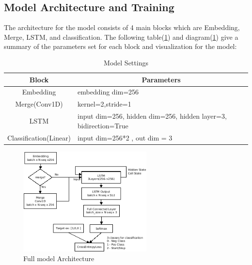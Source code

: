 \documentclass[12pt]{article}
\begin{document}
\subsection{Model Architecture and Training}\label{modelarch}
The architecture for the model consists of 4 main blocks which are Embedding, Merge, LSTM, and classification. The following table(\ref{tab:modelsettings}) and diagram(\ref{fig:modelArch}) give a summary of the parameters set for each block and visualization for the model:
\begin{table}[!h]
\begin{tabular}{|c|l|}
\hline
Block                   & \multicolumn{1}{c|}{Parameters}                                 \\ \hline
Embedding               & embedding dim=256                                               \\ \hline
Merge(Conv1D)          & kernel=2,stride=1                                               \\ \hline
LSTM                    & input dim=256, hidden dim=256, hidden layer=3, bidirection=True \\ \hline
Classification(Linear) & input dim=256*2 , out dim = 3                                   \\ \hline
\end{tabular}
\caption{Model Settings}
\label{tab:modelsettings}
\end{table}
\newpage
\begin{figure} [!h]
\begin{center}
\includegraphics[width=0.6\textwidth]{figures/modelDiagram.png}
\caption{Full model Architecture}
\label{fig:modelArch}
\end{center}
\end{figure}
\end{document}
